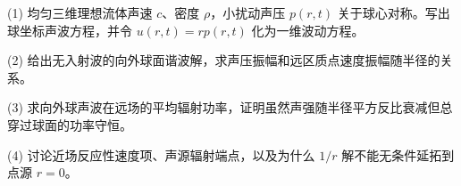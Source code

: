 (1) 均匀三维理想流体声速 \(c\)、密度 \(\rho\)，小扰动声压 \(p(r,t)\) 关于球心对称。写出球坐标声波方程，并令 \(u(r,t)=rp(r,t)\) 化为一维波动方程。

(2) 给出无入射波的向外球面谐波解，求声压振幅和远区质点速度振幅随半径的关系。

(3) 求向外球声波在远场的平均辐射功率，证明虽然声强随半径平方反比衰减但总穿过球面的功率守恒。

(4) 讨论近场反应性速度项、声源辐射端点，以及为什么 \(1/r\) 解不能无条件延拓到点源 \(r=0\)。
